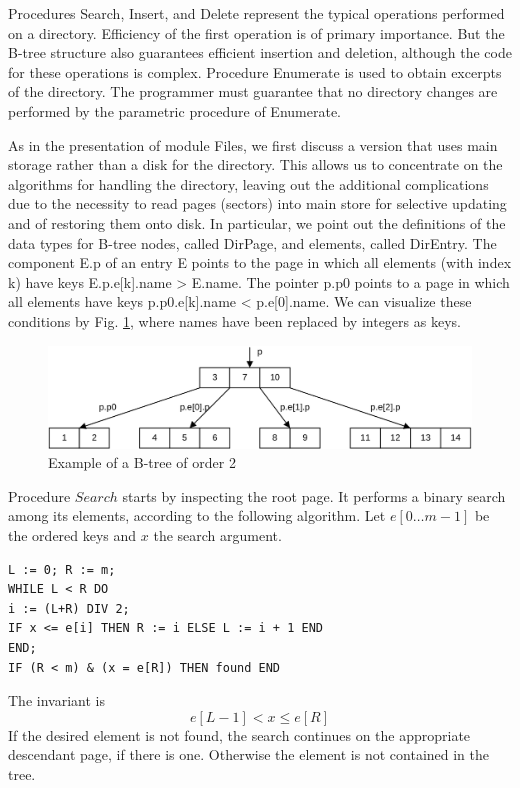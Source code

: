 Procedures Search, Insert, and Delete represent the typical operations performed on a directory.
Efficiency of the first operation is of primary importance. But the B-tree structure also guarantees
efficient insertion and deletion, although the code for these operations is complex. Procedure
Enumerate is used to obtain excerpts of the directory. The programmer must guarantee that no
directory changes are performed by the parametric procedure of Enumerate.

As in the presentation of module Files, we first discuss a version that uses main storage rather
than a disk for the directory. This allows us to concentrate on the algorithms for handling the
directory, leaving out the additional complications due to the necessity to read pages (sectors)
into main store for selective updating and of restoring them onto disk. In particular, we point out
the definitions of the data types for B-tree nodes, called DirPage, and elements, called DirEntry.
The component E.p of an entry E points to the page in which all elements (with index k) have
keys E.p.e[k].name > E.name. The pointer p.p0 points to a page in which all elements have keys
p.p0.e[k].name < p.e[0].name. We can visualize these conditions by Fig. \ref{fig:b-tree}, where names have
been replaced by integers as keys.
\begin{figure}
	\label{fig:b-tree}
	\centering
	\includegraphics[width=\textwidth]{i/n}
	\caption{Example of a B-tree of order 2}
\end{figure}

Procedure $Search$ starts by inspecting the root page. It performs a binary search among its
elements, according to the following algorithm. Let $e[0 \dots m-1]$ be the ordered keys and $x$ the
search argument.
\begin{verbatim}
L := 0; R := m;
WHILE L < R DO
i := (L+R) DIV 2;
IF x <= e[i] THEN R := i ELSE L := i + 1 END
END;
IF (R < m) & (x = e[R]) THEN found END
\end{verbatim}

The invariant is
\[ e[L-1] < x \leq e[R] \]
If the desired element is not found, the search continues on the appropriate descendant page, if
there is one. Otherwise the element is not contained in the tree.

